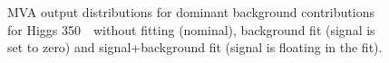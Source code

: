 \begin{figure}[!hbtp]
\caption{
MVA output distributions for dominant background contributions for
Higgs 350~\GeV\ without fitting (nominal), background fit (signal is
set to zero) and signal+background fit (signal is floating in the
fit).}
\label{fig:bdt2_350}
\end{figure}

